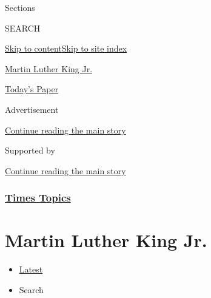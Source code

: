 Sections

SEARCH

\protect\hyperlink{site-content}{Skip to
content}\protect\hyperlink{site-index}{Skip to site index}

\href{https://www.nytimes3xbfgragh.onion/topic/person/martin-luther-king-jr}{Martin
Luther King Jr.}

\href{https://myaccount.nytimes3xbfgragh.onion/auth/login?response_type=cookie\&client_id=vi}{}

\href{https://www.nytimes3xbfgragh.onion/section/todayspaper}{Today's
Paper}

Advertisement

\protect\hyperlink{after-top}{Continue reading the main story}

Supported by

\protect\hyperlink{after-sponsor}{Continue reading the main story}

\hypertarget{times-topics}{%
\subsubsection{\texorpdfstring{\href{/index.html}{Times
Topics}}{Times Topics}}\label{times-topics}}

\hypertarget{martin-luther-king-jr}{%
\section{Martin Luther King Jr.}\label{martin-luther-king-jr}}

\begin{itemize}
\tightlist
\item
  \protect\hyperlink{stream-panel}{Latest}
\item
  Search
\end{itemize}


